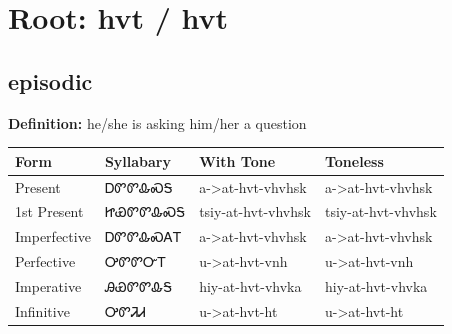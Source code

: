 \documentclass{article}%
\begin{document}
%
\normalsize%
\section*{Root: hvt / hvt}%
\subsection*{episodic}%
\textbf{Definition: }%
he/she is asking him/her a question%
\\[0.5em]%
\begin{tabular}{|l|l|l|l|}%
\hline%
\textbf{Form}&\textbf{Syllabary}&\textbf{With Tone}&\textbf{Toneless}\\%
\hline%
Present&ᎠᏛᏛᎲᏍᎦ&a{-}>at{-}hvt{-}vhvhsk&a{-}>at{-}hvt{-}vhvhsk\\%
1st Present&ᏥᏯᏛᏛᎲᏍᎦ&tsiy{-}at{-}hvt{-}vhvhsk&tsiy{-}at{-}hvt{-}vhvhsk\\%
Imperfective&ᎠᏛᏛᎲᏍᎪᎢ&a{-}>at{-}hvt{-}vhvhsk&a{-}>at{-}hvt{-}vhvhsk\\%
Perfective&ᎤᏛᏛᏅᎢ&u{-}>at{-}hvt{-}vnh&u{-}>at{-}hvt{-}vnh\\%
Imperative&ᎯᏯᏛᏛᎲᎦ&hiy{-}at{-}hvt{-}vhvka&hiy{-}at{-}hvt{-}vhvka\\%
Infinitive&ᎤᏛᏘᏗ&u{-}>at{-}hvt{-}ht&u{-}>at{-}hvt{-}ht\\%
\hline%
\end{tabular}%
\\[1em]%
\end{document}
